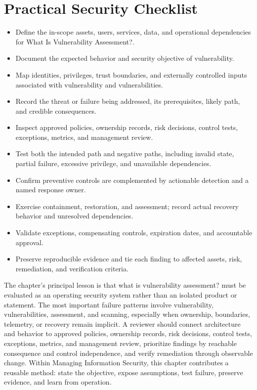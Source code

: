 \documentclass[11pt]{article}
\begin{document}
\section*{Practical Security Checklist}
\begin{itemize}[label=$\square$]
\item Define the in-scope assets, users, services, data, and operational dependencies for What Is Vulnerability Assessment?.
\item Document the expected behavior and security objective of vulnerability.
\item Map identities, privileges, trust boundaries, and externally controlled inputs associated with vulnerability and vulnerabilities.
\item Record the threat or failure being addressed, its prerequisites, likely path, and credible consequences.
\item Inspect approved policies, ownership records, risk decisions, control tests, exceptions, metrics, and management review.
\item Test both the intended path and negative paths, including invalid state, partial failure, excessive privilege, and unavailable dependencies.
\item Confirm preventive controls are complemented by actionable detection and a named response owner.
\item Exercise containment, restoration, and assessment; record actual recovery behavior and unresolved dependencies.
\item Validate exceptions, compensating controls, expiration dates, and accountable approval.
\item Preserve reproducible evidence and tie each finding to affected assets, risk, remediation, and verification criteria.
\end{itemize}
\begin{synthesisbox}
The chapter's principal lesson is that what is vulnerability assessment? must be evaluated as an operating security system rather than an isolated product or statement. The most important failure patterns involve vulnerability, vulnerabilities, assessment, and scanning, especially when ownership, boundaries, telemetry, or recovery remain implicit. A reviewer should connect architecture and behavior to approved policies, ownership records, risk decisions, control tests, exceptions, metrics, and management review, prioritize findings by reachable consequence and control independence, and verify remediation through observable change. Within Managing Information Security, this chapter contributes a reusable method: state the objective, expose assumptions, test failure, preserve evidence, and learn from operation.
\end{synthesisbox}
\end{document}
